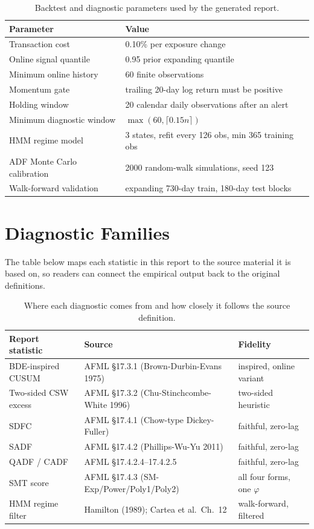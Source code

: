 \documentclass[11pt]{article}
\begin{document}
\begin{table}[H]
\centering
\small
\begin{tabular}{@{}lp{}@{}}
\toprule
Parameter & Value \\
\midrule
Transaction cost & 0.10\% per exposure change \\
Online signal quantile & 0.95 prior expanding quantile \\
Minimum online history & 60 finite observations \\
Momentum gate & trailing 20-day log return must be positive \\
Holding window & 20 calendar daily observations after an alert \\
Minimum diagnostic window & $\max(60, \lceil 0.15 n \rceil)$ \\
HMM regime model & 3 states, refit every 126 obs, min 365 training obs \\
ADF Monte Carlo calibration & 2000 random-walk simulations, seed 123 \\
Walk-forward validation & expanding 730-day train, 180-day test blocks \\
\bottomrule
\end{tabular}
\caption{Backtest and diagnostic parameters used by the generated report.}
\end{table}

\section{Diagnostic Families}

The table below maps each statistic in this report to the source material it is based on, so readers can connect the empirical output back to the original definitions.

\begin{table}[H]
\centering
\small
\begin{tabular}{@{}lll@{}}
\toprule
Report statistic & Source & Fidelity \\
\midrule
BDE-inspired CUSUM & AFML \S17.3.1 (Brown-Durbin-Evans 1975) & inspired, online variant \\
Two-sided CSW excess & AFML \S17.3.2 (Chu-Stinchcombe-White 1996) & two-sided heuristic \\
SDFC & AFML \S17.4.1 (Chow-type Dickey-Fuller) & faithful, zero-lag \\
SADF & AFML \S17.4.2 (Phillips-Wu-Yu 2011) & faithful, zero-lag \\
QADF / CADF & AFML \S17.4.2.4--17.4.2.5 & faithful, zero-lag \\
SMT score & AFML \S17.4.3 (SM-Exp/Power/Poly1/Poly2) & all four forms, one $\varphi$ \\
HMM regime filter & Hamilton (1989); Cartea et al.\ Ch.~12 & walk-forward, filtered \\
\bottomrule
\end{tabular}
\caption{Where each diagnostic comes from and how closely it follows the source definition.}
\end{table}
\end{document}
